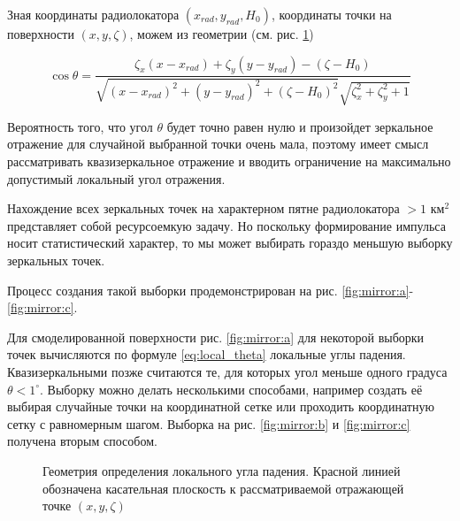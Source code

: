 Зная координаты радиолокатора  $(x_{rad},y_{rad},H_0)$, координаты точки на
поверхности $(x,y,\zeta)$, можем из геометрии (см. рис. \ref{fig:local_theta})

\begin{equation}
    \label{eq:local_theta}
    \cos \theta = \frac
    {\zeta_x (x - x_{rad}) + \zeta_y (y - y_{rad}) - (\zeta - H_0) }
        {
           \sqrt{(x - x_{rad})^2 + (y - y_{rad})^2 + (\zeta - H_0)^2 }
           \sqrt{\zeta_x^2 + \zeta_y^2 + 1}
        }
\end{equation}

Вероятность того, что угол $\theta$ будет точно равен нулю и произойдет
зеркальное отражение для случайной выбранной точки очень мала, поэтому имеет
смысл рассматривать квазизеркальное отражение и вводить ограничение на
максимально допустимый локальный угол отражения. 

Нахождение всех зеркальных точек на характерном пятне радиолокатора  $> 1
\text{ км}^2$ представляет собой ресурсоемкую задачу. Но поскольку формирование
импульса носит статистический характер, то мы может выбирать гораздо меньшую
выборку зеркальных точек. 

Процесс создания такой выборки продемонстрирован на рис. \ref{fig:mirror:a}-\ref{fig:mirror:c}. 

Для смоделированной поверхности  рис. \ref{fig:mirror:a} для некоторой
выборки точек вычисляются по формуле \eqref{eq:local_theta} локальные углы
падения. Квазизеркальными позже считаются те, для которых угол меньше одного
градуса $\theta < 1^\circ$. Выборку можно делать несколькими способами,
например создать её выбирая случайные точки на координатной сетке или проходить
координатную сетку с равномерным шагом. 
Выборка на рис. \ref{fig:mirror:b} и \ref{fig:mirror:c} получена вторым
способом. 

\begin{figure}[h!]
    \centering
    \def\svgwidth{0.75\linewidth}
    
    \caption{Геометрия определения локального угла падения. Красной линией
    обозначена касательная плоскость к рассматриваемой отражающей точке
$(x,y,\zeta)$}
    \label{fig:local_theta}
\end{figure}

